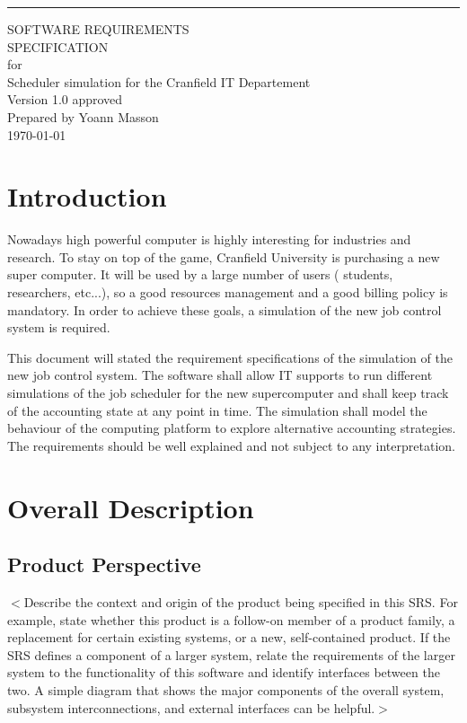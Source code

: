 \documentclass{scrreprt}
\date{}
\def\myversion{1.0 }
\begin{document}
\begin{flushright}
    \rule{16cm}{5pt}\vskip1cm
    \begin{bfseries}
        \Huge{SOFTWARE REQUIREMENTS\\ SPECIFICATION}\\
        \vspace{1.9cm}
        for\\
        \vspace{1.9cm}
        Scheduler simulation for the Cranfield IT Departement\\
        \vspace{1.9cm}
        \LARGE{Version \myversion approved}\\
        \vspace{1.9cm}
        Prepared by Yoann Masson\\
        \today\\
    \end{bfseries}
\end{flushright}

\tableofcontents

\chapter{Introduction}

Nowadays high powerful computer is highly interesting for industries and research. To stay on top of the game, Cranfield University is purchasing a new super computer. It will be used by a large number of users ( students, researchers, etc...), so a good resources management and a good billing policy is mandatory. In order to achieve these goals, a simulation of the new job control system is required. 

This document will stated the requirement specifications of the simulation of the new job control system. The software shall allow IT supports to run different simulations of the job scheduler for the new supercomputer and shall keep track of the accounting state at any point in time. The simulation shall model the behaviour of the computing platform to explore alternative accounting strategies.
The requirements should be well explained and not subject to any interpretation.



\chapter{Overall Description}

\section{Product Perspective}
$<$Describe the context and origin of the product being specified in this SRS.  
For example, state whether this product is a follow-on member of a product 
family, a replacement for certain existing systems, or a new, self-contained 
product. If the SRS defines a component of a larger system, relate the 
requirements of the larger system to the functionality of this software and 
identify interfaces between the two. A simple diagram that shows the major 
components of the overall system, subsystem interconnections, and external 
interfaces can be helpful.$>$
\end{document}
